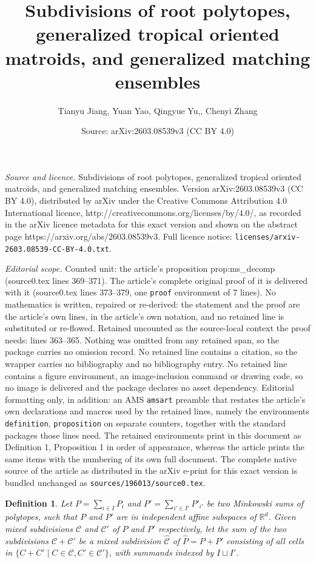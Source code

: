\documentclass[10pt,a4paper]{amsart}
\title{Subdivisions of root polytopes, generalized tropical oriented matroids, and generalized matching ensembles}
\author{Tianyu Jiang, Yuan Yao, Qingyue Yu,, Chenyi Zhang}
\date{Source: arXiv:2603.08539v3 (CC BY 4.0)}
\newtheorem{definition}{Definition}
\begin{document}
\maketitle

\noindent\emph{Source and licence.} Subdivisions of root polytopes, generalized tropical oriented matroids, and generalized matching ensembles. Version arXiv:2603.08539v3 (CC BY 4.0), distributed by arXiv under the Creative Commons Attribution 4.0 International licence, http://creativecommons.org/licenses/by/4.0/, as recorded in the arXiv licence metadata for this exact version and shown on the abstract page https://arxiv.org/abs/2603.08539v3. Full licence notice: \texttt{licenses/arxiv-2603.08539-CC-BY-4.0.txt}.\par\smallskip

\noindent\textit{Editorial scope.} Counted unit: the article's proposition prop:ms\_decomp (source0.tex lines 369--371). The article's complete original proof of it is delivered with it (source0.tex lines 373--379, one \texttt{proof} environment of 7 lines). No mathematics is written, repaired or re-derived: the statement and the proof are the article's own lines, in the article's own notation, and no retained line is substituted or re-flowed.  Retained uncounted as the source-local context the proof needs: lines 363--365.  Nothing was omitted from any retained span, so the package carries no omission record.  No retained line contains a citation, so the wrapper carries no bibliography and no bibliography entry.  No retained line contains a figure environment, an image-inclusion command or drawing code, so no image is delivered and the package declares no asset dependency.  Editorial formatting only, in addition: an AMS \texttt{amsart} preamble that restates the article's own declarations and macros used by the retained lines, namely the environments \texttt{definition}, \texttt{proposition} on separate counters, together with the standard packages those lines need.  The retained environments print in this document as Definition 1, Proposition 1 in order of appearance, whereas the article prints the same items with the numbering of its own full document.  The complete native source of the article as distributed in the arXiv e-print for this exact version is bundled unchanged as \texttt{sources/196013/source0.tex}.
\begin{definition}\label{def:ms_sum}
    Let $P = \sum_{i\in I} P_i$ and $P' = \sum_{i'\in I'} P'_{i'}$ be two Minkowski sums of polytopes, such that $P$ and $P'$ are in independent affine subspaces of $\mathbb{R}^d$. Given mixed subdivisions $\mathcal{C}$ and $\mathcal{C}'$ of $P$ and $P'$ respectively, let the \emph{sum of the two subdivisions} $\mathcal{C} + \mathcal{C}'$ be a mixed subdivision $\hat{\mathcal{C}}$ of $\hat{P} = P + P'$ consisting of all cells in $\{C + C'\mid C\in \mathcal{C}, C'\in \mathcal{C}'\}$, with summands indexed by $I\sqcup I'$.
\end{definition}
\end{document}

